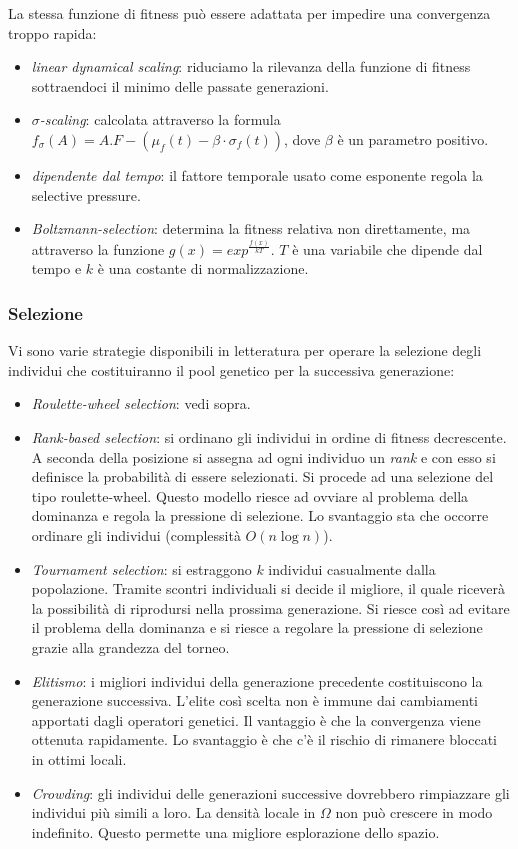 \documentclass[10pt,a4paper]{article}
\begin{document}
La stessa funzione di fitness può essere adattata per impedire una convergenza troppo rapida:

\begin{itemize}
\item{\emph{linear dynamical scaling}: riduciamo la rilevanza della funzione di fitness sottraendoci il minimo delle passate generazioni.}
\item{\emph{$\sigma$-scaling}: calcolata attraverso la formula $f_{\sigma}(A) = A.F - (\mu_f(t) - \beta \cdot \sigma_f(t))$, dove $\beta$ è un parametro positivo.}
\item{\emph{dipendente dal tempo}: il fattore temporale usato come esponente regola la selective pressure.}
\item{\emph{Boltzmann-selection}: determina la fitness relativa non direttamente, ma attraverso la funzione $g(x) = exp^{\frac{f(x)}{kT}}$. $T$ è una variabile che dipende dal tempo e $k$ è una costante di normalizzazione.}
\end{itemize}

\subsubsection{Selezione}

Vi sono varie strategie disponibili in letteratura per operare la selezione degli individui che costituiranno il pool genetico per la successiva generazione:

\begin{itemize}
\item{\emph{Roulette-wheel selection}: vedi sopra.}
\item{\emph{Rank-based selection}: si ordinano gli individui in ordine di fitness decrescente. A seconda della posizione si assegna ad ogni individuo un \emph{rank} e con esso si definisce la probabilità di essere selezionati. Si procede ad una selezione del tipo roulette-wheel. Questo modello riesce ad ovviare al problema della dominanza e regola la pressione di selezione. Lo svantaggio sta che occorre ordinare gli individui (complessità $O(n \log n)$).}
\item{\emph{Tournament selection}: si estraggono $k$ individui casualmente dalla popolazione. Tramite scontri individuali si decide il migliore, il quale riceverà la possibilità di riprodursi nella prossima generazione. Si riesce così ad evitare il problema della dominanza e si riesce a regolare la pressione di selezione grazie alla grandezza del torneo.}
\item{\emph{Elitismo}: i migliori individui della generazione precedente costituiscono la generazione successiva. L'elite così scelta non è immune dai cambiamenti apportati dagli operatori genetici. Il vantaggio è che la convergenza viene ottenuta rapidamente. Lo svantaggio è che c'è il rischio di rimanere bloccati in ottimi locali.}
\item{\emph{Crowding}: gli individui delle generazioni successive dovrebbero rimpiazzare gli individui più simili a loro. La densità locale in $\Omega$ non può crescere in modo indefinito. Questo permette una migliore esplorazione dello spazio.}
\end{itemize}
\end{document}

